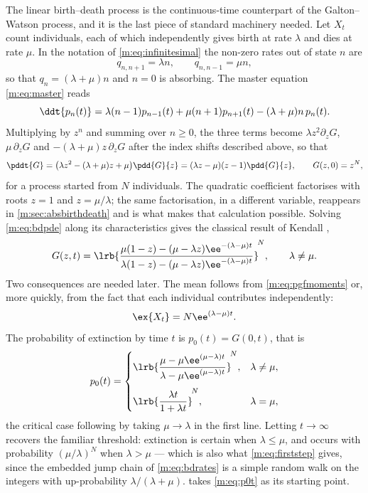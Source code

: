 The linear birth--death process is the continuous-time counterpart of the
Galton--Watson process, and it is the last piece of standard machinery needed.
Let $X_t$ count individuals, each of which independently gives birth at rate
$\lambda$ and dies at rate $\mu$. In the notation of \cref{m:eq:infinitesimal} the
non-zero rates out of state $n$ are
\begin{equation}
\label{m:eq:bdrates}
q_{n,n+1} = \lambda n,
\qquad
q_{n,n-1} = \mu n ,
\end{equation}
so that $q_n = (\lambda+\mu)n$ and $n=0$ is absorbing. The master equation
\cref{m:eq:master} reads
\begin{equation}
\label{m:eq:bdmaster}
\ddt{p_n(t)} = \lambda(n-1)p_{n-1}(t) + \mu(n+1)p_{n+1}(t) - (\lambda+\mu)n\,p_n(t).
\end{equation}
Multiplying by $z^n$ and summing over $n\ge0$, the three terms become
$\lambda z^2\partial_zG$, $\mu\,\partial_zG$ and $-(\lambda+\mu)z\,\partial_zG$
after the index shifts described above, so that
\begin{equation}
\label{m:eq:bdpde}
\pddt{G} = \bigl(\lambda z^2 - (\lambda+\mu)z + \mu\bigr)\pdd{G}{z}
= (\lambda z-\mu)(z-1)\pdd{G}{z},
\qquad G(z,0) = z^{N},
\end{equation}
for a process started from $N$ individuals. The quadratic coefficient factorises
with roots $z=1$ and $z=\mu/\lambda$; the same factorisation, in a different
variable, reappears in \cref{m:sec:absbirthdeath} and is what makes that calculation
possible. Solving \cref{m:eq:bdpde} along its characteristics gives the classical
result of Kendall \cite{Kendall1948},
\begin{equation}
\label{m:eq:bdsolution}
G(z,t) = \lrb{\frac{\mu(1-z) - (\mu-\lambda z)\ee^{-(\lambda-\mu)t}}
{\lambda(1-z) - (\mu-\lambda z)\ee^{-(\lambda-\mu)t}}}^{\!N},
\qquad \lambda\neq\mu .
\end{equation}
Two consequences are needed later. The mean follows from
\cref{m:eq:pgfmoments} or, more quickly, from the fact that each individual
contributes independently:
\begin{equation}
\label{m:eq:bdmean}
\ex{X_t} = N\ee^{(\lambda-\mu)t}.
\end{equation}
The probability of extinction by time $t$ is $p_0(t) = G(0,t)$, that is
\begin{equation}
\label{m:eq:p0t}
p_0(t) =
\begin{cases}
\displaystyle\lrb{\frac{\mu-\mu\ee^{(\mu-\lambda)t}}{\lambda-\mu\ee^{(\mu-\lambda)t}}}^{\!N},
& \lambda\neq\mu,\\[14pt]
\displaystyle\lrb{\frac{\lambda t}{1+\lambda t}}^{\!N},
& \lambda=\mu,
\end{cases}
\end{equation}
the critical case following by taking $\mu\to\lambda$ in the first line. Letting
$t\to\infty$ recovers the familiar threshold: extinction is certain when
$\lambda\le\mu$, and occurs with probability $(\mu/\lambda)^N$ when
$\lambda>\mu$ --- which is also what \cref{m:eq:firststep} gives, since the embedded
jump chain of \cref{m:eq:bdrates} is a simple random walk on the integers with
up-probability $\lambda/(\lambda+\mu)$.  takes \cref{m:eq:p0t} as its
starting point.
